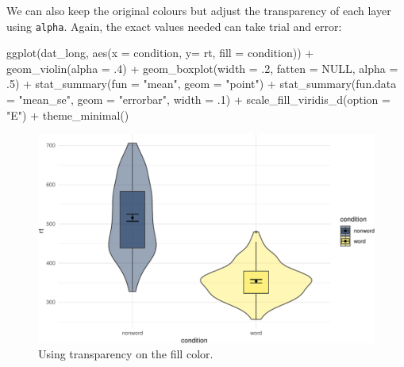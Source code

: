 \documentclass[
  english,
  doc,floatsintext]{apa6}
\newenvironment{Shaded}{\begin{snugshade}}{\end{snugshade}}
\newcommand{\AttributeTok}[1]{\textcolor[rgb]{0.77,0.63,0.00}{#1}}
\newcommand{\ConstantTok}[1]{\textcolor[rgb]{0.00,0.00,0.00}{#1}}
\newcommand{\DecValTok}[1]{\textcolor[rgb]{0.00,0.00,0.81}{#1}}
\newcommand{\FunctionTok}[1]{\textcolor[rgb]{0.00,0.00,0.00}{#1}}
\newcommand{\NormalTok}[1]{#1}
\newcommand{\SpecialCharTok}[1]{\textcolor[rgb]{0.00,0.00,0.00}{#1}}
\newcommand{\StringTok}[1]{\textcolor[rgb]{0.31,0.60,0.02}{#1}}
\begin{document}
We can also keep the original colours but adjust the transparency of each layer using \texttt{alpha}. Again, the exact values needed can take trial and error:

\begin{Shaded}
\begin{Highlighting}[]
\FunctionTok{ggplot}\NormalTok{(dat\_long, }\FunctionTok{aes}\NormalTok{(}\AttributeTok{x =}\NormalTok{ condition, }\AttributeTok{y=}\NormalTok{ rt, }\AttributeTok{fill =}\NormalTok{ condition)) }\SpecialCharTok{+}
  \FunctionTok{geom\_violin}\NormalTok{(}\AttributeTok{alpha =}\NormalTok{ .}\DecValTok{4}\NormalTok{) }\SpecialCharTok{+}
  \FunctionTok{geom\_boxplot}\NormalTok{(}\AttributeTok{width =}\NormalTok{ .}\DecValTok{2}\NormalTok{, }\AttributeTok{fatten =} \ConstantTok{NULL}\NormalTok{, }\AttributeTok{alpha =}\NormalTok{ .}\DecValTok{5}\NormalTok{) }\SpecialCharTok{+}
  \FunctionTok{stat\_summary}\NormalTok{(}\AttributeTok{fun =} \StringTok{"mean"}\NormalTok{, }\AttributeTok{geom =} \StringTok{"point"}\NormalTok{) }\SpecialCharTok{+}
  \FunctionTok{stat\_summary}\NormalTok{(}\AttributeTok{fun.data =} \StringTok{"mean\_se"}\NormalTok{, }\AttributeTok{geom =} \StringTok{"errorbar"}\NormalTok{, }\AttributeTok{width =}\NormalTok{ .}\DecValTok{1}\NormalTok{) }\SpecialCharTok{+}
  \FunctionTok{scale\_fill\_viridis\_d}\NormalTok{(}\AttributeTok{option =} \StringTok{"E"}\NormalTok{) }\SpecialCharTok{+}
  \FunctionTok{theme\_minimal}\NormalTok{()}
\end{Highlighting}
\end{Shaded}

\begin{figure}

{\centering \includegraphics[width=1\linewidth]{images/viobox6-1} 

}

\caption{Using transparency on the fill color.}\label{fig:viobox6}
\end{figure}
\end{document}

